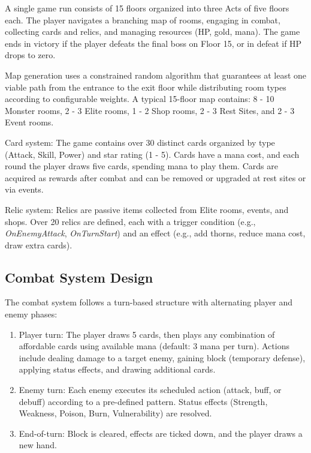 A single game run consists of 15 floors organized into three Acts of five floors each. The player navigates a branching map of rooms, engaging in combat, collecting cards and relics, and managing resources (HP, gold, mana). The game ends in victory if the player defeats the final boss on Floor 15, or in defeat if HP drops to zero.

Map generation uses a constrained random algorithm that guarantees at least one viable path from the entrance to the exit floor while distributing room types according to configurable weights. A typical 15-floor map contains: 8 - 10 Monster rooms, 2 - 3 Elite rooms, 1 - 2 Shop rooms, 2 - 3 Rest Sites, and 2 - 3 Event rooms.

Card system: The game contains over 30 distinct cards organized by type (Attack, Skill, Power) and star rating (1 - 5). Cards have a mana cost, and each round the player draws five cards, spending mana to play them. Cards are acquired as rewards after combat and can be removed or upgraded at rest sites or via events.

Relic system: Relics are passive items collected from Elite rooms, events, and shops. Over 20 relics are defined, each with a trigger condition (e.g., \textit{OnEnemyAttack}, \textit{OnTurnStart}) and an effect (e.g., add thorns, reduce mana cost, draw extra cards).

\subsection{Combat System Design}

The combat system follows a turn-based structure with alternating player and enemy phases:

\begin{enumerate}
    \item Player turn: The player draws 5 cards, then plays any combination of affordable cards using available mana (default: 3 mana per turn). Actions include dealing damage to a target enemy, gaining block (temporary defense), applying status effects, and drawing additional cards.
    \item Enemy turn: Each enemy executes its scheduled action (attack, buff, or debuff) according to a pre-defined pattern. Status effects (Strength, Weakness, Poison, Burn, Vulnerability) are resolved.
    \item End-of-turn: Block is cleared, effects are ticked down, and the player draws a new hand.
\end{enumerate}

